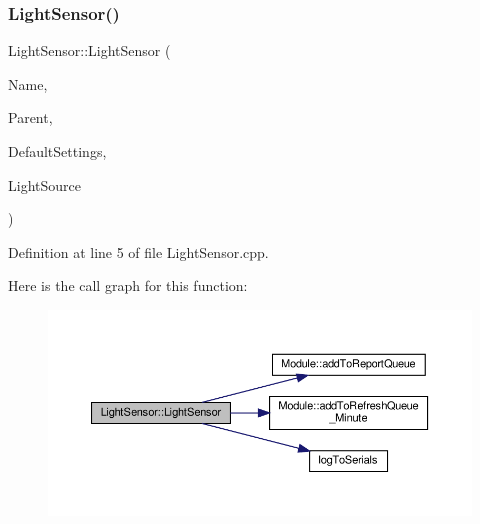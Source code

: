 \subsubsection{\texorpdfstring{Light\+Sensor()}{LightSensor()}\hspace{0.1cm}{\footnotesize\ttfamily [1/2]}}
{\footnotesize\ttfamily Light\+Sensor\+::\+Light\+Sensor (\begin{DoxyParamCaption}\item[{const \+\_\+\+\_\+\+Flash\+String\+Helper $\ast$}]{Name,  }\item[{\hyperlink{class_module}{Module} $\ast$}]{Parent,  }\item[{\hyperlink{struct_settings_1_1_light_sensor_settings}{Settings\+::\+Light\+Sensor\+Settings} $\ast$}]{Default\+Settings,  }\item[{\hyperlink{class_lights}{Lights} $\ast$}]{Light\+Source }\end{DoxyParamCaption})}



Definition at line 5 of file Light\+Sensor.\+cpp.

Here is the call graph for this function\+:
\nopagebreak
\begin{figure}[H]
\begin{center}
\leavevmode
\includegraphics[width=350pt]{class_light_sensor_aa2b15bb718f72a125dcc068300abfba7_cgraph}
\end{center}
\end{figure}
\mbox{\label{class_light_sensor_aa2b15bb718f72a125dcc068300abfba7}} 
